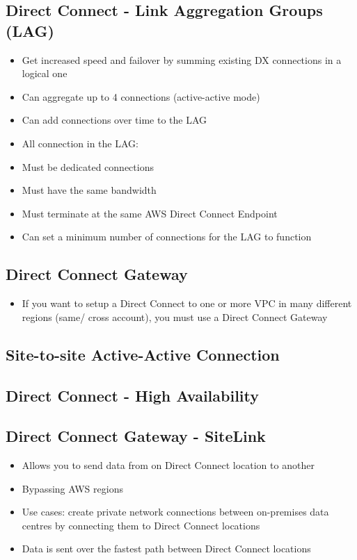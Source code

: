 \subsection{Direct Connect - Link Aggregation Groups (LAG)}
\begin{itemize}
    \item Get increased speed and failover by summing existing DX connections in a logical one
    \item Can aggregate up to 4 connections (active-active mode)
    \item Can add connections over time to the LAG
    \item All connection in the LAG:
    \item Must be dedicated connections
    \item Must have the same bandwidth
    \item Must terminate at the same AWS Direct Connect Endpoint
    \item Can set a minimum number of connections for the LAG to function
\end{itemize}

\subsection{Direct Connect Gateway}
\begin{itemize}
    \item If you want to setup a Direct Connect to one or more VPC in many different regions (same/ cross account), you must use a Direct Connect Gateway
\end{itemize}

\subsection{Site-to-site Active-Active Connection}

\subsection{Direct Connect - High Availability}

\subsection{Direct Connect Gateway - SiteLink}
\begin{itemize}
    \item Allows you to send data from on Direct Connect location to another
    \item Bypassing AWS regions
    \item Use cases: create private network connections between on-premises data centres by connecting them to Direct Connect locations
    \item Data is sent over the fastest path between Direct Connect locations
\end{itemize}


